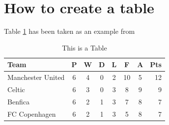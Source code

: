 \section{How to create a table}
Table \ref{tab:sample_table} has been taken as an example from \citep{latexTables}

\begin{table}
\centering
\begin{tabular}{l*{6}{c}r}
Team              & P & W & D & L & F  & A & Pts \\
\hline
Manchester United & 6 & 4 & 0 & 2 & 10 & 5 & 12  \\
Celtic            & 6 & 3 & 0 & 3 &  8 & 9 &  9  \\
Benfica           & 6 & 2 & 1 & 3 &  7 & 8 &  7  \\
FC Copenhagen     & 6 & 2 & 1 & 3 &  5 & 8 &  7  \\
\end{tabular}
\caption{This is a Table}
\label{tab:sample_table}
\end{table}